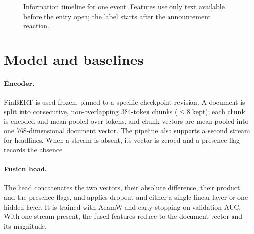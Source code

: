 \documentclass[11pt]{article}
\begin{document}
\begin{figure}[t]
\centering
{}
\caption{Information timeline for one event. Features use only text available before the entry
open; the label starts after the announcement reaction.}
\label{fig:timeline}
\end{figure}

\section{Model and baselines}\label{sec:model}
\paragraph{Encoder.} FinBERT is used frozen, pinned to a specific checkpoint revision. A document is
split into consecutive, non-overlapping 384-token chunks ($\le 8$ kept); each chunk is encoded and
mean-pooled over tokens, and chunk vectors are mean-pooled into one 768-dimensional document vector.
The pipeline also supports a second stream for headlines. When a stream is absent, its vector is
zeroed and a presence flag records the absence.
\paragraph{Fusion head.} The head concatenates the two vectors, their absolute difference, their
product and the presence flags, and applies dropout and either a single linear layer or one hidden
layer. It is trained with AdamW and early stopping on validation AUC. With one stream present, the
fused features reduce to the document vector and its magnitude.
\end{document}
